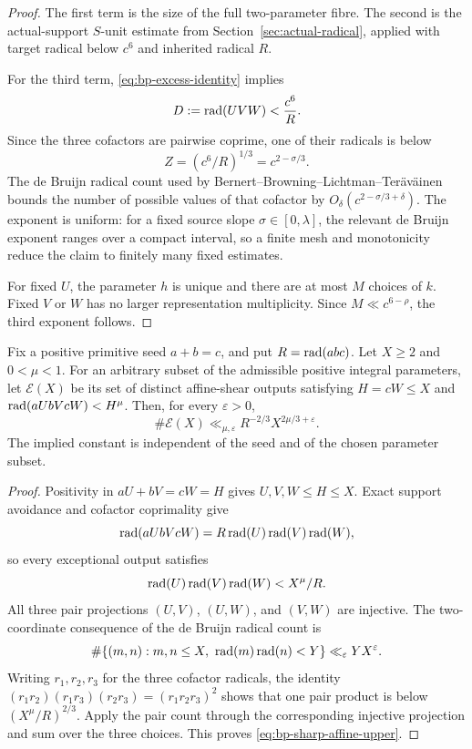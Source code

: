 \begin{proof}
The first term is the size of the full two-parameter fibre.  The second is
the actual-support $S$-unit estimate from Section~\ref{sec:actual-radical},
applied with target radical below $c^6$ and inherited radical $R$.

For the third term, \eqref{eq:bp-excess-identity} implies
\[
 D:=\operatorname{rad}(UVW)<\frac{c^6}{R}.
\]
Since the three cofactors are pairwise coprime, one of their radicals is
below
\[
                         Z=(c^6/R)^{1/3}=c^{2-\sigma/3}.
\]
The de Bruijn radical count used by
Bernert--Browning--Lichtman--Ter\"av\"ainen~\cite{BBLT} bounds the number of
possible values of that cofactor by
$O_\delta(c^{2-\sigma/3+\delta})$.  The exponent is uniform: for a fixed
source slope $\sigma\in[0,\lambda]$, the relevant de Bruijn exponent ranges
over a compact interval, so a finite mesh and monotonicity reduce the claim
to finitely many fixed estimates.

For fixed $U$, the parameter $h$ is unique and there are at most $M$ choices
of $k$.  Fixed $V$ or $W$ has no larger representation multiplicity.
Since $M\ll c^{6-\rho}$, the third exponent follows.
\end{proof}

\begin{theorem}
Fix a positive primitive seed $a+b=c$, and put $R=\operatorname{rad}(abc)$.  Let
$X\geq2$ and $0<\mu<1$.  For an arbitrary subset of the admissible positive
integral parameters, let $\mathcal E(X)$ be its set of distinct affine-shear
outputs satisfying $H=cW\leq X$ and $\operatorname{rad}(aUbVcW)<H^\mu$.  Then, for every
$\varepsilon>0$,
\begin{equation}\label{eq:bp-sharp-affine-upper}
 \#\mathcal E(X)\ll_{\mu,\varepsilon}
        R^{-2/3}X^{2\mu/3+\varepsilon}.
\end{equation}
The implied constant is independent of the seed and of the chosen parameter
subset.
\end{theorem}

\begin{proof}
Positivity in $aU+bV=cW=H$ gives $U,V,W\leq H\leq X$.  Exact support
avoidance and cofactor coprimality give
\[
 \operatorname{rad}(aUbVcW)=R\operatorname{rad}(U)\operatorname{rad}(V)\operatorname{rad}(W),
\]
so every exceptional output satisfies
\[
 \operatorname{rad}(U)\operatorname{rad}(V)\operatorname{rad}(W)<X^\mu/R.
\]
All three pair projections $(U,V)$, $(U,W)$, and $(V,W)$ are injective.  The
two-coordinate consequence of the de Bruijn radical count is
\[
 \#\{(m,n):m,n\leq X,\ \rad(m)\rad(n)<Y\}
 \ll_\varepsilon YX^\varepsilon.
\]
Writing $r_1,r_2,r_3$ for the three cofactor radicals, the identity
$(r_1r_2)(r_1r_3)(r_2r_3)=(r_1r_2r_3)^2$ shows that one pair product is below
$(X^\mu/R)^{2/3}$.  Apply the pair count through the corresponding injective
projection and sum over the three choices.  This proves
\eqref{eq:bp-sharp-affine-upper}.
\end{proof}

